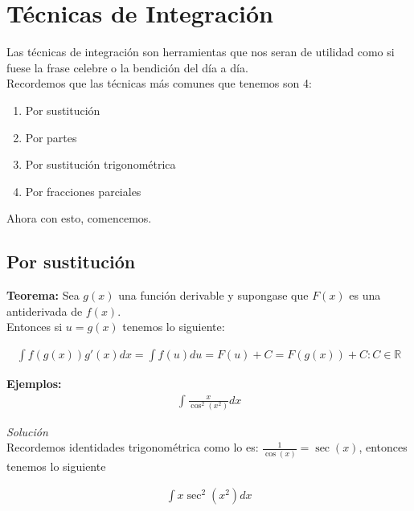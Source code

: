 \chapter{Técnicas de Integración}
Las técnicas de integración son herramientas que nos seran de utilidad como si fuese la frase celebre o la bendición del día a día.\\
Recordemos que las técnicas más comunes que tenemos son 4:
\begin{enumerate}
  \item Por sustitución
  \item Por partes
  \item Por sustitución trigonométrica
  \item Por fracciones parciales
\end{enumerate}
Ahora con esto, comencemos.
\section{Por sustitución}
\textbf{Teorema:} Sea \(\displaystyle g(x) \) una función derivable y supongase que \(\displaystyle F(x)\) es una antiderivada de \(\displaystyle f(x)\).\\

Entonces si \(\displaystyle u=g(x)\) tenemos lo siguiente:

\begin{equation*}
    \begin{gathered}
        \int f(g(x))g'(x)dx = \int f(u)du = F(u) + C = F(g(x)) + C   \colon C \in \mathbb{R}
    \end{gathered}
\end{equation*}

\textbf{Ejemplos:}
\begin{equation}
    \begin{gathered}
        \int \frac{x}{\cos^{2}(x^{2})}dx
    \end{gathered}
\end{equation}

\textit{Solución}\\

Recordemos identidades trigonométrica como lo es: \(\displaystyle \frac{1}{\cos(x)}=\sec(x) \), entonces tenemos lo siguiente

\begin{equation*}
    \begin{gathered}
        \int x \sec^{2}(x^2)dx
    \end{gathered}
\end{equation*}

